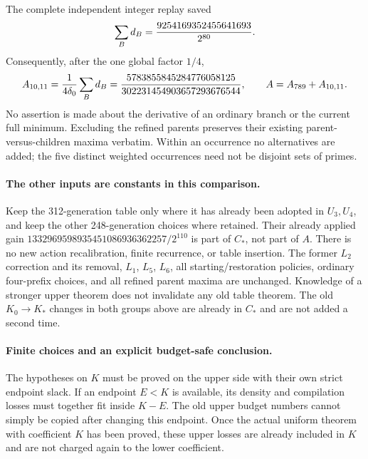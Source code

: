 The complete independent integer replay saved
\[
 \sum_B d_B={9254169352455641693\over2^{80}}.
\]
Consequently, after the one global factor $1/4$,
\[
 A_{10,11}={1\over4\delta_0}\sum_Bd_B
 ={5783855845284776058125\over302231454903657293676544},
 \qquad A=A_{789}+A_{10,11}.
\]
No assertion is made about the derivative of an ordinary branch or
the current full minimum. Excluding the refined parents preserves
their existing parent-versus-children maxima verbatim. Within an
occurrence no alternatives are added; the five distinct weighted
occurrences need not be disjoint sets of primes.

\paragraph{The other inputs are constants in this comparison.}
Keep the 312-generation table only where it has already been adopted
in $U_3,U_4$, and keep the other 248-generation choices where retained.
Their already applied gain
$1332969598935451086936362257/2^{110}$ is part of $C_*$, not part of
$A$. There is no new action recalibration, finite recurrence, or table
insertion. The former $L_2$ correction and its removal, $L_1$, $L_5$,
$L_6$, all starting/restoration policies, ordinary four-prefix choices,
and all refined parent maxima are unchanged. Knowledge of a stronger
upper theorem does not invalidate any old table theorem. The old
$K_0\to K_*$ changes in both groups above are already in $C_*$ and
are not added a second time.

\paragraph{Finite choices and an explicit budget-safe conclusion.}
The hypotheses on $K$ must be proved on the upper side with their own
strict endpoint slack. If an endpoint $E<K$ is available, its density
and compilation losses must together fit inside $K-E$. The old upper
budget numbers cannot simply be copied after changing this endpoint.
Once the actual uniform theorem with coefficient $K$ has been proved,
these upper losses are already included in $K$ and are not charged
again to the lower coefficient.


